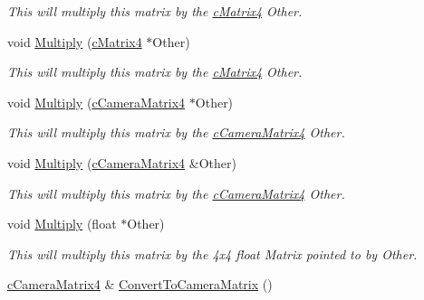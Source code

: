 \begin{DoxyCompactItemize}
\begin{DoxyCompactList}\small\item\em This will multiply this matrix by the \hyperlink{classc_matrix4}{cMatrix4} Other. \end{DoxyCompactList}\item 
\hypertarget{classc_matrix4_aa36c01bc7f4f7a7ac47c1e154cd8a4ba}{
void \hyperlink{classc_matrix4_aa36c01bc7f4f7a7ac47c1e154cd8a4ba}{Multiply} (\hyperlink{classc_matrix4}{cMatrix4} $\ast$Other)}
\label{classc_matrix4_aa36c01bc7f4f7a7ac47c1e154cd8a4ba}

\begin{DoxyCompactList}\small\item\em This will multiply this matrix by the \hyperlink{classc_matrix4}{cMatrix4} Other. \end{DoxyCompactList}\item 
\hypertarget{classc_matrix4_a4eddb15044110cb20c1fa8df80bf1e05}{
void \hyperlink{classc_matrix4_a4eddb15044110cb20c1fa8df80bf1e05}{Multiply} (\hyperlink{classc_camera_matrix4}{cCameraMatrix4} $\ast$Other)}
\label{classc_matrix4_a4eddb15044110cb20c1fa8df80bf1e05}

\begin{DoxyCompactList}\small\item\em This will multiply this matrix by the \hyperlink{classc_camera_matrix4}{cCameraMatrix4} Other. \end{DoxyCompactList}\item 
\hypertarget{classc_matrix4_a8cd8d9304a6bc454d635c2e37f340fa7}{
void \hyperlink{classc_matrix4_a8cd8d9304a6bc454d635c2e37f340fa7}{Multiply} (\hyperlink{classc_camera_matrix4}{cCameraMatrix4} \&Other)}
\label{classc_matrix4_a8cd8d9304a6bc454d635c2e37f340fa7}

\begin{DoxyCompactList}\small\item\em This will multiply this matrix by the \hyperlink{classc_camera_matrix4}{cCameraMatrix4} Other. \end{DoxyCompactList}\item 
\hypertarget{classc_matrix4_a67be2f0c0552a8c88ccd25e6fe4c3e4e}{
void \hyperlink{classc_matrix4_a67be2f0c0552a8c88ccd25e6fe4c3e4e}{Multiply} (float $\ast$Other)}
\label{classc_matrix4_a67be2f0c0552a8c88ccd25e6fe4c3e4e}

\begin{DoxyCompactList}\small\item\em This will multiply this matrix by the 4x4 float Matrix pointed to by Other. \end{DoxyCompactList}\item 
\hypertarget{classc_matrix4_ac6bb495542c08395c26fd412db13a959}{
\hyperlink{classc_camera_matrix4}{cCameraMatrix4} \& \hyperlink{classc_matrix4_ac6bb495542c08395c26fd412db13a959}{ConvertToCameraMatrix} ()}
\label{classc_matrix4_ac6bb495542c08395c26fd412db13a959}


\end{DoxyCompactItemize}

